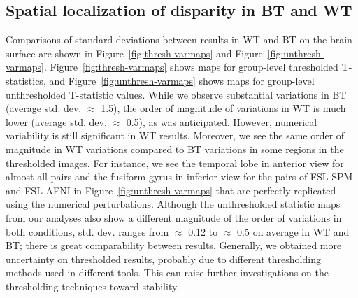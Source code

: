 \documentclass[runningheads]{llncs}
\begin{document}
\subsection{Spatial localization of disparity in BT and WT}


Comparisons of standard deviations between results in WT and BT
on the brain surface are shown in Figure~\ref{fig:thresh-varmaps} and Figure~\ref{fig:unthresh-varmaps}.
Figure~\ref{fig:thresh-varmaps} shows maps for group-level thresholded T-statistics, and
Figure~\ref{fig:unthresh-varmaps} shows maps for group-level unthresholded T-statistic values.
While we observe substantial variations in BT (average std. dev. $\approx$ 1.5),
the order of magnitude of variations in WT is much lower (average std. dev. $\approx$ 0.5),
as was anticipated. However, numerical variability is still significant in WT results.
Moreover, we see the same order of magnitude in WT variations compared to BT variations
in some regions in the thresholded images.
For instance, we see the temporal lobe in anterior view for almost all pairs and the fusiform gyrus in inferior view
for the pairs of FSL-SPM and FSL-AFNI in Figure~\ref{fig:unthresh-varmaps}
that are perfectly replicated using the numerical perturbations. 
Although the unthresholded statistic maps from our analyses also show a different magnitude of
the order of variations in both conditions, std. dev. ranges from $\approx$ 0.12 to $\approx$ 0.5 on average in WT and BT;
there is great comparability between results.
Generally, we obtained more uncertainty on thresholded results, probably due to different thresholding
methods used in different tools.
This can raise further investigations on the thresholding techniques toward stability.
\end{document}
